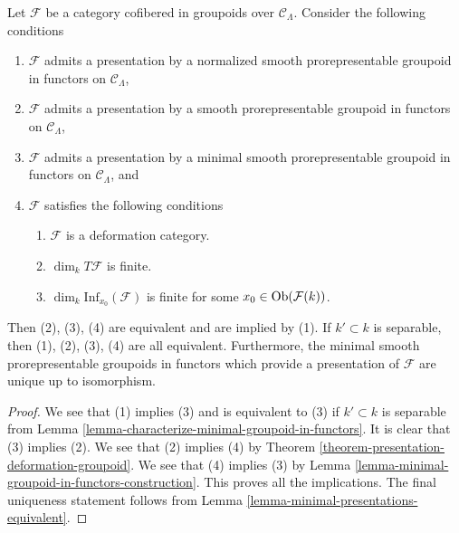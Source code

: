 \begin{theorem}
\label{theorem-minimal-smooth-prorepresentable-presentations}
Let $\mathcal{F}$ be a category cofibered in groupoids over
$\mathcal{C}_\Lambda$. Consider the following conditions
\begin{enumerate}
\item $\mathcal{F}$ admits a presentation by a normalized
smooth prorepresentable groupoid in functors on $\mathcal{C}_\Lambda$,
\item $\mathcal{F}$ admits a presentation by a
smooth prorepresentable groupoid in functors on $\mathcal{C}_\Lambda$,
\item $\mathcal{F}$ admits a presentation by a minimal
smooth prorepresentable groupoid in functors on $\mathcal{C}_\Lambda$, and
\item $\mathcal{F}$ satisfies the following conditions
\begin{enumerate}
\item $\mathcal{F}$ is a deformation category.
\item $\dim_k T\mathcal{F}$ is finite.
\item $\dim_k \text{Inf}_{x_0}(\mathcal{F})$ is finite for some
$x_0 \in \mathop{\rm Ob}\nolimits(\mathcal{F}(k))$.
\end{enumerate}
\end{enumerate}
Then (2), (3), (4) are equivalent and are implied by (1).
If $k' \subset k$ is separable, then (1), (2), (3), (4) are all equivalent.
Furthermore, the minimal smooth prorepresentable groupoids in functors
which provide a presentation of $\mathcal{F}$ are unique up to isomorphism.
\end{theorem}

\begin{proof}
We see that (1) implies (3) and is equivalent to (3) if
$k' \subset k$ is separable from
Lemma \ref{lemma-characterize-minimal-groupoid-in-functors}.
It is clear that (3) implies (2). We see that (2) implies (4) by
Theorem \ref{theorem-presentation-deformation-groupoid}.
We see that (4) implies (3) by
Lemma \ref{lemma-minimal-groupoid-in-functors-construction}.
This proves all the implications.
The final uniqueness statement follows from
Lemma \ref{lemma-minimal-presentations-equivalent}.
\end{proof}














